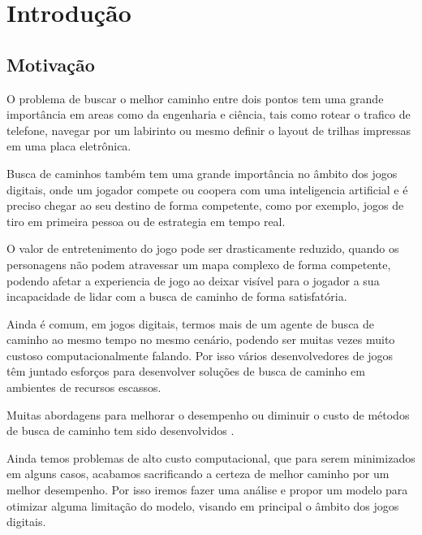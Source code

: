 
\chapter[Introdução]{Introdução}

\section{Motivação}

O problema de buscar o melhor caminho entre dois pontos tem uma grande importância em areas como da engenharia e ciência, tais como rotear o trafico de telefone, navegar por um labirinto ou mesmo definir o layout de trilhas impressas em uma placa eletrônica.

Busca de caminhos também tem uma grande importância no âmbito dos jogos digitais, onde um jogador compete ou coopera com uma inteligencia artificial e é preciso chegar ao seu destino de forma competente, como por exemplo, jogos de tiro em primeira pessoa ou de estrategia em tempo real.

O valor de entretenimento do jogo pode ser drasticamente reduzido, quando os personagens não podem atravessar um mapa complexo de forma competente, podendo afetar a experiencia de jogo ao deixar visível para o jogador a sua incapacidade de lidar com a busca de caminho de forma satisfatória.

Ainda é comum, em jogos digitais, termos mais de um agente de busca de caminho ao mesmo tempo no mesmo cenário, podendo ser muitas vezes muito custoso computacionalmente falando. Por isso vários desenvolvedores de jogos têm juntado esforços para desenvolver soluções de busca de caminho em ambientes de recursos escassos.



\cite{Pontevia}


Muitas abordagens para melhorar o desempenho ou diminuir o custo de métodos de busca de caminho tem sido desenvolvidos \cite{Ulysses}  \cite{Pollack} \cite{Timothy} \cite{WilliamMiller}. 

Ainda temos problemas de alto custo computacional, que para serem minimizados em alguns casos, acabamos sacrificando a certeza de melhor caminho por um melhor desempenho\cite{Botea}\cite{KORF199341}. Por isso iremos fazer uma análise e propor um modelo para otimizar alguma limitação do modelo, visando em principal o âmbito dos jogos digitais.


